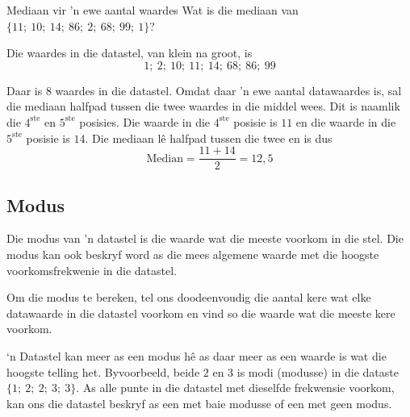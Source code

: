 \begin{wex}{Mediaan vir 'n ewe aantal waardes}
{Wat is die mediaan van $\{11;\ 10;\ 14;\ 86;\ 2;\ 68;\ 99;\ 1\}$?}
{

  Die waardes in die datastel, van klein na groot, is
  \begin{equation*}
    1;\ 2;\ 10;\ 11;\ 14;\ 68;\ 86;\ 99
  \end{equation*}


  Daar is $8$ waardes in die datastel. Omdat daar 'n ewe aantal datawaardes is, sal die mediaan halfpad tussen die twee waardes in die middel wees. Dit is naamlik die $4^{\mathrm{ste}}$ en $5^{\mathrm{ste}}$ posisies. Die waarde in die 
  $4^{\mathrm{ste}}$ posisie is $11$ en die waarde in die $5^{\mathrm{ste}}$ posisie is
  $14$. Die mediaan l\^e halfpad tussen die twee en is dus
  \begin{equation*}
    \mbox{Median} = \frac{11+14}{2} = 12,5
  \end{equation*}
}
\end{wex}

\subsection{Modus}
{Die modus van 'n datastel is die waarde wat die meeste voorkom in die stel. Die modus kan ook beskryf word as die mees algemene waarde met die hoogste voorkomsfrekwenie in die datastel.}

Om die modus te bereken, tel ons doodeenvoudig die aantal kere wat elke datawaarde in die datastel voorkom en vind so die waarde wat die meeste kere voorkom.\par

‘n Datastel kan meer as een modus hê as daar meer as een waarde is wat die hoogste telling het. Byvoorbeeld, beide $2$ en $3$ is modi (modusse) in die dataste $\{1;\ 2;\ 2;\ 3;\ 3\}$. As alle punte in die datastel met dieselfde frekwensie voorkom, kan ons die datastel beskryf as een met baie modusse of een met geen modus. 

